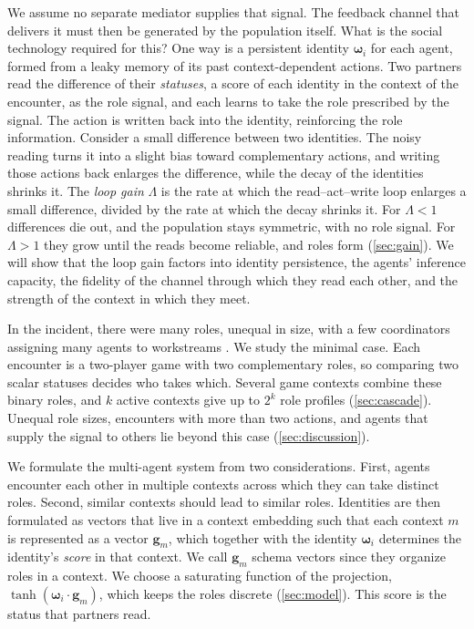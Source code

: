 \documentclass[
  aps,prx,
  reprint,
  superscriptaddress,
  nofootinbib,
  longbibliography
]{revtex4-2}
\newcommand{\w}{\bm{\omega}}
\newcommand{\g}{\mathbf{g}}
\begin{document}
We assume no separate mediator supplies that signal. The feedback channel that delivers it must then be generated by the population itself. What is the social technology required for this? One way is a persistent identity $\w_i$ for each agent, formed from a leaky memory of its past context-dependent actions. Two partners read the difference of their \emph{statuses}, a score of each identity in the context of the encounter, as the role signal, and each learns to take the role prescribed by the signal. The action is written back into the identity, reinforcing the role information. Consider a small difference between two identities. The noisy reading turns it into a slight bias toward complementary actions, and writing those actions back enlarges the difference, while the decay of the identities shrinks it. The \emph{loop gain} $\Lambda$ is the rate at which the read--act--write loop enlarges a small difference, divided by the rate at which the decay shrinks it. For $\Lambda<1$ differences die out, and the population stays symmetric, with no role signal. For $\Lambda>1$ they grow until the reads become reliable, and roles form (\cref{sec:gain}). We will show that the loop gain factors into identity persistence, the agents' inference capacity, the fidelity of the channel through which they read each other, and the strength of the context in which they meet.

In the incident, there were many roles, unequal in size, with a few coordinators assigning many agents to workstreams \cite{metr2026incident}. We study the minimal case. Each encounter is a two-player game with two complementary roles, so comparing two scalar statuses decides who takes which. Several game contexts combine these binary roles, and $k$ active contexts give up to $2^k$ role profiles (\cref{sec:cascade}). Unequal role sizes, encounters with more than two actions, and agents that supply the signal to others lie beyond this case (\cref{sec:discussion}).

We formulate the multi-agent system from two considerations. First, agents encounter each other in multiple contexts across which they can take distinct roles. Second, similar contexts should lead to similar roles. Identities are then formulated as vectors that live in a context embedding such that each context $m$ is represented as a vector $\g_m$, which together with the identity $\w_i$ determines the identity's \textit{score} in that context. We call $\g_m$ schema vectors since they organize roles in a context. We choose a saturating function of the projection, $\tanh(\w_i\cdot\g_m)$, which keeps the roles discrete (\cref{sec:model}). This score is the status that partners read.
\end{document}
